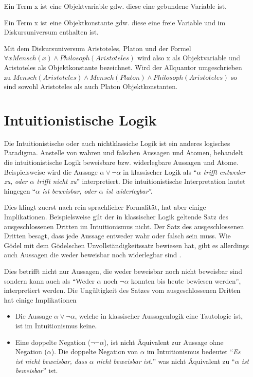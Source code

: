 Ein Term x ist eine Objektvariable gdw. diese eine gebundene Variable ist.

Ein Term x ist eine Objektkonstante gdw. diese eine freie Variable und im Diskursuniversum enthalten ist.

Mit dem Diskursuniversum {Aristoteles, Platon} und der Formel $\forall x Mensch(x) \wedge Philosoph(Aristoteles)$ wird also x als Objektvariable und Aristoteles als Objektkonstante bezeichnet. Wird der Allquantor umgeschrieben zu $Mensch(Aristoteles) \wedge Mensch(Platon) \wedge Philosoph(Aristoteles)$ so sind sowohl Aristoteles als auch Platon Objektkonstanten.

\section{Intuitionistische Logik}
Die Intuitionistische oder auch nichtklassiche Logik ist ein anderes logisches Paradigma. Anstelle von wahren und falschen Aussagen und Atomen, behandelt die intuitionistische Logik beweisbare bzw. widerlegbare Aussagen und Atome. Beispielsweise wird die Aussage $\alpha\vee\neg\alpha$ in klassischer Logik als ``\textit{$\alpha$ trifft entweder zu, oder $\alpha$ trifft nicht zu}'' interpretiert. Die intuitionistische Interpretation lautet hingegen ``\textit{$\alpha$ ist beweisbar, oder $\alpha$ ist widerlegbar}''.

Dies klingt zuerst nach rein sprachlicher Formalität, hat aber einige Implikationen. Beispielsweise gilt der in klassischer Logik geltende Satz des ausgeschlossenen Dritten im Intuitionismus nicht. Der Satz des ausgeschlossenen Dritten besagt, dass jede Aussage entweder wahr oder falsch sein muss. Wie Gödel mit dem Gödelschen Unvollständigkeitssatz bewiesen hat, gibt es allerdings auch Aussagen die weder beweisbar noch widerlegbar sind \cite{B62}. 

Dies betrifft nicht nur Aussagen, die weder beweisbar noch nicht beweisbar sind sondern kann auch als ``Weder $\alpha$ noch $\neg\alpha$ konnten bis heute bewiesen werden'', interpretiert werden. Die Ungültigkeit des Satzes vom ausgeschlossenen Dritten hat einige Implikationen \cite{B62}
\begin{itemize}
\item Die Aussage $\alpha\vee\neg\alpha$, welche in klassischer Aussagenlogik eine Tautologie ist, ist im Intuitionismus keine.

\item Eine doppelte Negation ($\neg\neg\alpha$), ist nicht Äquivalent zur Aussage ohne Negation ($\alpha$). Die doppelte Negation von $\alpha$ im Intuitionismus bedeutet ``\textit{Es ist nicht beweisbar, dass $\alpha$ nicht beweisbar ist.}'' was nicht Äquivalent zu ``\textit{$\alpha$ ist beweisbar}'' ist.
\end{itemize}

